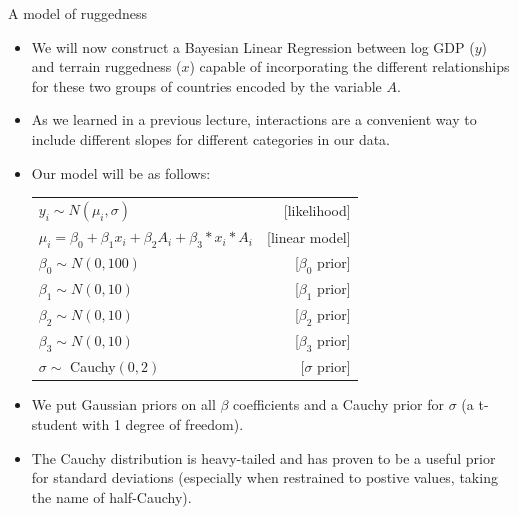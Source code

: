 \documentclass[handout]{beamer}
\begin{document}
\begin{frame}{A model of ruggedness}
\scriptsize{

\begin{itemize}
\item We will now construct a Bayesian Linear Regression between log GDP ($y$) and terrain ruggedness ($x$) capable of incorporating the different relationships for these two groups of countries encoded by the variable $A$.
\item As we learned in a previous lecture, interactions are a convenient way to include different slopes for different categories in our data.
\item Our model will be as follows:

 \vspace{0.3cm}
 \begin{table}
 \centering
 \begin{tabular}{lr}  
$y_i \sim N(\mu_i,\sigma)$ & [likelihood] \\
$\mu_i = \beta_0 + \beta_1 x_i+ \beta_2 A_i+\beta_3*x_i*A_i$ & [linear model] \\
$\beta_0 \sim N(0,100)$ & [$\beta_0$ prior] \\
$\beta_1 \sim N(0,10)$ & [$\beta_1$ prior] \\
$\beta_2 \sim N(0,10)$ & [$\beta_2$ prior] \\
$\beta_3 \sim N(0,10)$ & [$\beta_3$ prior] \\
$\sigma \sim $ Cauchy$(0,2)$ & [$\sigma$ prior] \\
\end{tabular}
\end{table}

\item We put Gaussian priors on all $\beta$ coefficients and a Cauchy prior for $\sigma$ (a t-student with 1 degree of freedom).

\item The Cauchy distribution is heavy-tailed and has proven to be a useful prior for standard deviations (especially when restrained to postive values, taking the name of half-Cauchy). 

\end{itemize}




} 
\end{frame}
\end{document}
